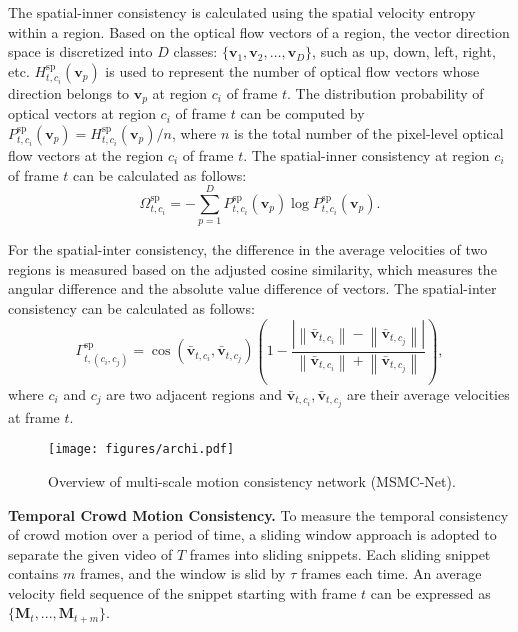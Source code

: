 \documentclass[journal]{IEEEtran}
\begin{document}
The spatial-inner consistency is calculated using the spatial velocity entropy within a region.
Based on the optical flow vectors of a region, the vector direction space is discretized into $D$ classes: $\{\mathbf{v}_1,\mathbf{v}_2, \dots ,\mathbf{v}_D\}$, such as up, down, left, right, etc. $H_{t,c_i}^{\mathrm{sp}}(\mathbf{v}_p) $ is used to represent the number of optical flow vectors whose direction belongs to $\mathbf{v}_p$ at region $c_i$ of frame $t$. The distribution probability of optical vectors at region $c_i$ of frame $t$ can be computed by $P_{t,c_i}^{\mathrm{sp}}(\mathbf{v}_p)=H^{\mathrm{sp}}_{t,c_i}(\mathbf{v}_p) /n$, where $n$ is the total number of the pixel-level optical flow vectors at the region $c_i$ of frame $ t $. The spatial-inner consistency at region $ c_i $ of frame $ t $ can be calculated as follows:
\begin{equation}
\Omega^{\mathrm{sp}}_{t,c_i}=-\sum_{p=1}^{D} P^{\mathrm{sp}}_{t,c_i}(\mathbf{v}_p) \log P^{\mathrm{sp}}_{t,c_i}(\mathbf{v}_p).
\end{equation}

For the spatial-inter consistency, the difference in the average velocities of two regions is measured based on the adjusted cosine similarity, which measures the angular difference and the absolute value difference of vectors.
The spatial-inter consistency can be calculated as follows:
\begin{equation}
\Gamma^{\mathrm{sp}}_{t,(c_{i},c_{j})}  =  \cos (\mathbf{\bar{v}}_{t,c_i},\mathbf{\bar{v}}_{t,c_j})
(1-\frac{\left|\left\|\mathbf{\bar{v}}_{t,c_i}\right\|-\left\|\mathbf{\bar{v}}_{t,c_j}\right\|\right|}
{\left\|\mathbf{\bar{v}}_{t,c_i}\right\|+\left\|\mathbf{\bar{v}}_{t,c_j}\right\|}),
\end{equation}
where $ c_i $ and $ c_j $ are two adjacent regions and $\mathbf{\bar{v}}_{t,c_i},\mathbf{\bar{v}}_{t,c_j}$ are their average velocities at frame $t$.

\begin{figure*}[t]
\centering
\texttt{[image: figures/archi.pdf]}
\caption{
Overview of multi-scale motion consistency network (MSMC-Net).
}\label{fig:architect}
\end{figure*}

\vskip 0.03in
\noindent\textbf{Temporal Crowd Motion Consistency.}
To measure the temporal consistency of crowd motion over a period of time, a sliding window approach is adopted to separate the given video of $T$ frames into sliding snippets. Each sliding snippet contains $m$ frames, and the window is slid by $\tau$ frames each time. An average velocity field sequence of the snippet starting with frame $t$ can be expressed as $\{ \mathbf{M}_{t}, ... ,\mathbf{M}_{t+m} \}$.
\end{document}
